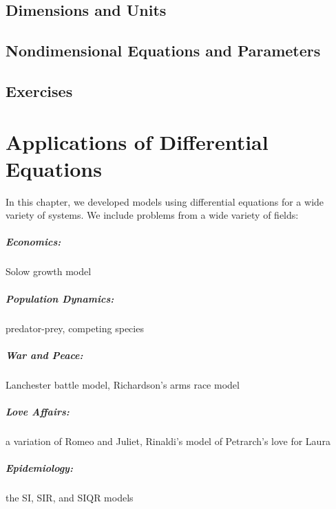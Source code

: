 \documentclass[reqno]{immbook}
\begin{document}
\section{Dimensions and Units}
\section{Nondimensional Equations and Parameters}
\section{Exercises}
%
%
%

\chapter{Applications of Differential Equations}
%
In this chapter, we developed models using differential
equations for a wide variety of systems.
We include problems from a wide variety of fields:
\paragraph{Economics:} Solow growth model
\paragraph{Population Dynamics:} predator-prey, competing species
\paragraph{War and Peace:} Lanchester battle model, Richardson's arms
race model
\paragraph{Love Affairs:} a variation of Romeo and Juliet, Rinaldi's
model of Petrarch's love for Laura
\paragraph{Epidemiology:} the SI, SIR, and SIQR models
%
\end{document}
